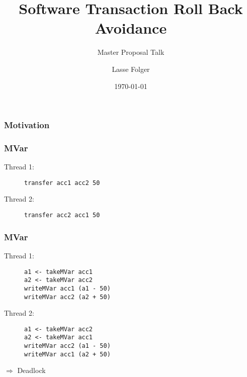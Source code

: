 \documentclass{beamer}
\author{Lasse Folger}
\title{\huge Software Transaction Roll Back Avoidance}
\subtitle{Master Proposal Talk}
\date{\today}
\begin{document}
  \begin{frame}[t,plain]
    \titlepage
  \end{frame}
  
  
  \begin{frame}
    \frametitle{Motivation}
    
  \end{frame}
  
  \begin{frame}[fragile]
    \frametitle{MVar}
    \fboxsep=0pt
    \noindent
    \begin{minipage}[t]{0.48\linewidth}
      Thread 1:
            \begin{figure}
       \begin{lstlisting}[frame=single]
transfer acc1 acc2 50
       \end{lstlisting}
      \end{figure}
\end{minipage}%
    \hfill%
    \begin{minipage}[t]{0.48\linewidth}
      Thread 2:      
      \begin{figure}
       \begin{lstlisting}[frame=single]
transfer acc2 acc1 50
       \end{lstlisting}
      \end{figure}
    \end{minipage}
\end{frame}

  \begin{frame}[fragile]
    \frametitle{MVar}
    \fboxsep=0pt
    \noindent
    \begin{minipage}[t]{0.48\linewidth}
      Thread 1:
            \begin{figure}
       \begin{lstlisting}[frame=single]
a1 <- takeMVar acc1 
a2 <- takeMVar acc2 
writeMVar acc1 (a1 - 50)
writeMVar acc2 (a2 + 50)
       \end{lstlisting}
      \end{figure}
\end{minipage}%
    \hfill%
    \begin{minipage}[t]{0.48\linewidth}
      Thread 2:      
      \begin{figure}
       \begin{lstlisting}[frame=single]
a1 <- takeMVar acc2 
a2 <- takeMVar acc1 
writeMVar acc2 (a1 - 50)
writeMVar acc1 (a2 + 50)
       \end{lstlisting}
      \end{figure}
    \end{minipage}
    \vfill
    \pause
    $\Rightarrow$ Deadlock
\end{frame}
  
\end{document}
